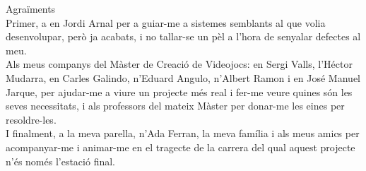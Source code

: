 \newpage

{\LARGE Agraïments}
\\

Primer, a en Jordi Arnal per a guiar-me a sistemes semblants al que volia desenvolupar, però ja acabats, i no tallar-se un pèl a l'hora de senyalar defectes al meu.
\\

Als meus companys del Màster de Creació de Videojocs: en Sergi Valls, l'Héctor Mudarra, en Carles Galindo, n'Eduard Angulo, n'Albert Ramon i en José Manuel Jarque, per ajudar-me a viure un projecte més real i fer-me veure quines són les seves necessitats, i als professors del mateix Màster per donar-me les eines per resoldre-les.
\\

I finalment, a la meva parella, n'Ada Ferran, la meva família i als meus amics per acompanyar-me i animar-me en el tragecte de la carrera del qual aquest projecte n'és només l'estació final.